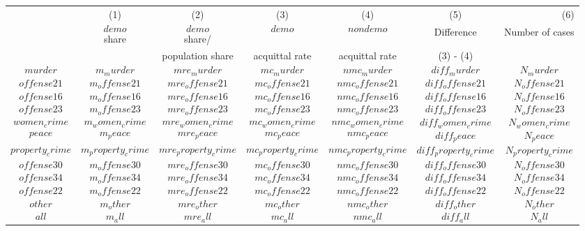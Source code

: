{
\def\sym#1{\ifmmode^{#1}\else\(^{#1}\)\fi}
\begin{tabular}{lcccccr}
  \hline\hline
&\multicolumn{1}{c}{(1)}&\multicolumn{1}{c}{(2)}&\multicolumn{1}{c}{(3)}&\multicolumn{1}{c}{(4)}&\multicolumn{1}{c}{(5)}&\multicolumn{1}{r}{(6)}\\
&{$$demo$$ share}&{$$demo$$ share/}&{$$demo$$}&{$$nondemo$$} &  {Difference} & {Number of cases}\\
&{}&{population share}&{acquittal rate}&{acquittal rate} & {(3) - (4)} & {}\\
\hline
$$murder$$ & $$m_murder$$ & $$mre_murder$$ & $$mc_murder$$ & $$nmc_murder$$ & $$diff_murder$$ & $$N_murder$$\\
$$offense21$$ & $$m_offense21$$ & $$mre_offense21$$ & $$mc_offense21$$ & $$nmc_offense21$$ & $$diff_offense21$$ & $$N_offense21$$\\
$$offense16$$ & $$m_offense16$$ & $$mre_offense16$$ & $$mc_offense16$$ & $$nmc_offense16$$ & $$diff_offense16$$ & $$N_offense16$$\\
$$offense23$$ & $$m_offense23$$ & $$mre_offense23$$ & $$mc_offense23$$ & $$nmc_offense23$$ & $$diff_offense23$$ & $$N_offense23$$\\
$$women_crime$$ & $$m_women_crime$$ & $$mre_women_crime$$ & $$mc_women_crime$$ & $$nmc_women_crime$$ & $$diff_women_crime$$ & $$N_women_crime$$\\
$$peace$$ & $$m_peace$$ & $$mre_peace$$ & $$mc_peace$$ & $$nmc_peace$$ & $$diff_peace$$ & $$N_peace$$\\
$$property_crime$$ & $$m_property_crime$$ & $$mre_property_crime$$ & $$mc_property_crime$$ & $$nmc_property_crime$$ & $$diff_property_crime$$ & $$N_property_crime$$\\
$$offense30$$ & $$m_offense30$$ & $$mre_offense30$$ & $$mc_offense30$$ & $$nmc_offense30$$ & $$diff_offense30$$ & $$N_offense30$$\\
$$offense34$$ & $$m_offense34$$ & $$mre_offense34$$ & $$mc_offense34$$ & $$nmc_offense34$$ & $$diff_offense34$$ & $$N_offense34$$\\
$$offense22$$ & $$m_offense22$$ & $$mre_offense22$$ & $$mc_offense22$$ & $$nmc_offense22$$ & $$diff_offense22$$ & $$N_offense22$$\\
$$other$$ & $$m_other$$ & $$mre_other$$ & $$mc_other$$ & $$nmc_other$$ & $$diff_other$$ & $$N_other$$\\
\hline
$$all$$ & $$m_all$$ & $$mre_all$$ & $$mc_all$$ & $$nmc_all$$ & $$diff_all$$ & $$N_all$$\\
\hline\hline
\end{tabular}
}
